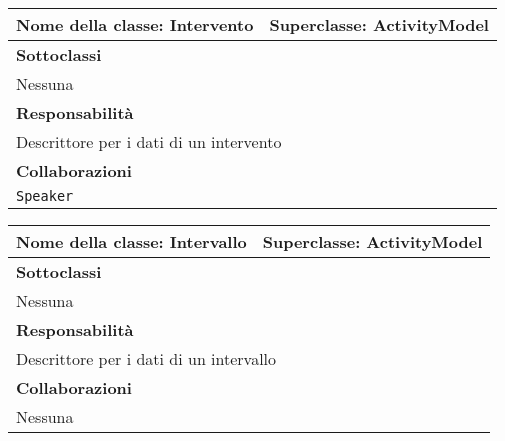 \begin{table}[h!]
\centering
\begin{tabular}{|l|l|}
\hline
\textbf{Nome della classe:} Intervento & \textbf{Superclasse}: ActivityModel \\ \hline
\multicolumn{2}{|l|}{\textbf{Sottoclassi}}\\
\multicolumn{2}{|l|}{Nessuna} \\ \hline
\multicolumn{2}{|l|}{\textbf{Responsabilità}}\\
\multicolumn{2}{|l|}{Descrittore per i dati di un intervento} \\ \hline
\multicolumn{2}{|l|}{\textbf{Collaborazioni}}\\
\multicolumn{2}{|l|}{\texttt{Speaker}} \\ \hline
\end{tabular}
\end{table}

\begin{table}[h!]
\centering
\begin{tabular}{|l|l|}
\hline
\textbf{Nome della classe:} Intervallo & \textbf{Superclasse}: ActivityModel \\ \hline
\multicolumn{2}{|l|}{\textbf{Sottoclassi}}\\
\multicolumn{2}{|l|}{Nessuna} \\ \hline
\multicolumn{2}{|l|}{\textbf{Responsabilità}}\\
\multicolumn{2}{|l|}{Descrittore per i dati di un intervallo} \\ \hline
\multicolumn{2}{|l|}{\textbf{Collaborazioni}}\\
\multicolumn{2}{|l|}{Nessuna} \\ \hline
\end{tabular}
\end{table}

